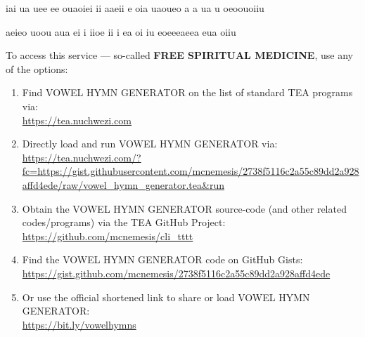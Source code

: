 \documentclass[a4paper, 18pt]{book} %
\begin{document}
{{\vspace{2em}

  
   \begin{tcbverbatim}[title=Sample Vowel Hymn OUTPUT]
iai ua uee
ee ouaoiei
ii aaeii e
oia uaoueo
a a ua u
 oeoouoiiu
  \end{tcbverbatim}
 

\vspace{2em}


\vspace{2em}

  
   \begin{tcbverbatim}[title=Sample Vowel Hymn OUTPUT]
aeieo uoou
aua ei i 
iioe ii i 
ea oi iu 
eoeeeaeea 
eua oiiu 
  \end{tcbverbatim}
  
  
  
  \vspace{2em}

To access this service --- so-called \textbf{FREE SPIRITUAL MEDICINE}, use any of the options:

\vspace{2em}

\begin{enumerate}
\item Find VOWEL HYMN GENERATOR on the list of standard TEA programs via:\\ \url{https://tea.nuchwezi.com}
\item Directly load and run VOWEL HYMN GENERATOR via: {\normalsize \url{https://tea.nuchwezi.com/?fc=https://gist.githubusercontent.com/mcnemesis/2738f5116c2a55c89dd2a928affd4ede/raw/vowel_hymn_generator.tea&run} }
\item{Obtain the VOWEL HYMN GENERATOR source-code (and other related codes/programs) via the TEA GitHub Project:\\
\url{https://github.com/mcnemesis/cli_tttt}}
\item{ Find the VOWEL HYMN GENERATOR code on GitHub Gists:\\
\url{https://gist.github.com/mcnemesis/2738f5116c2a55c89dd2a928affd4ede}}
\item{ Or use the official shortened link to share or load VOWEL HYMN GENERATOR:\\
 \url{https://bit.ly/vowelhymns}
 }
\end{enumerate}

\vspace{2em}
  
  
  

}}
\end{document}
